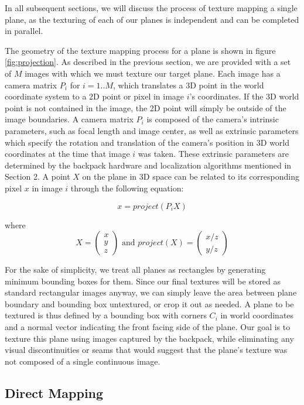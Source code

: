 \documentclass[10pt,twocolumn,letterpaper]{article}
\begin{document}
In all subsequent sections, we will discuss the process of texture
mapping a single plane, as the texturing of each of our planes is
independent and can be completed in parallel.

The geometry of the texture mapping process for a plane is shown in
figure \ref{fig:projection}.  As described in the previous section, we
are provided with a set of $M$ images with which we must texture our
target plane. Each image has a camera matrix $P_i$ for $i=1..M$, which
translates a 3D point in the world coordinate system to a 2D point or
pixel in image $i$'s coordinates. If the 3D world point is not
contained in the image, the 2D point will simply be outside of the
image boundaries. A camera matrix $P_i$ is composed of the camera's
intrinsic parameters, such as focal length and image center, as well
as extrinsic parameters which specify the rotation and translation of
the camera's position in 3D world coordinates at the time that image
$i$ was taken. These extrinsic parameters are determined by the
backpack hardware and localization algorithms mentioned in Section
2. A point $X$ on the plane in 3D space can be related to its
corresponding pixel $x$ in image $i$ through the following equation:

\[
x=project(P_iX)
\]

where
\[X = \begin{pmatrix} x \\ y \\ z \end{pmatrix} \textrm{ and }
project(X) = \begin{pmatrix} x/z \\ y/z \end{pmatrix}
\]

For the sake of simplicity, we treat all planes as rectangles by
generating minimum bounding boxes for them. Since our final textures
will be stored as standard rectangular images anyway, we can simply
leave the area between plane boundary and bounding box untextured, or
crop it out as needed. A plane to be textured is thus defined by a
bounding box with corners $C_i$ in world coordinates and a normal
vector indicating the front facing side of the plane. Our goal is to
texture this plane using images captured by the backpack, while
eliminating any visual discontinuities or seams that would suggest
that the plane's texture was not composed of a single continuous
image.



\subsection{Direct Mapping}
\end{document}
